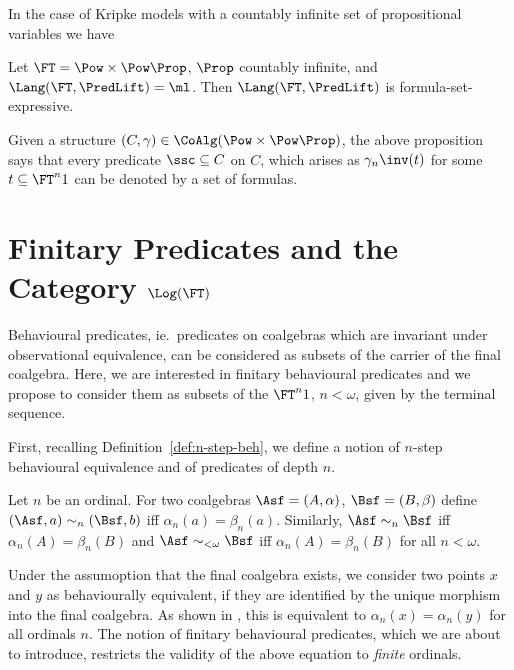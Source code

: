 \documentclass{entcs}
\begin{document}
In the case of Kripke models with a countably infinite set of propositional
variables we have

\begin{propn} \label{propn:surjection-weak}
  Let $\FT=\Pow\times\Pow\Prop$, $\Prop$ countably infinite, and
  $\Lang(\FT,\PredLift)=\ml$. 
  Then $\Lang(\FT,\PredLift)$ is formula-set-expressive.
\end{propn}
\noindent
Given a structure $(C, \gamma) \in \CoAlg(\Pow\times\Pow\Prop)$, the above
proposition says that every predicate $\ssc \subseteq C$ on $C$, which arises
as $\gamma_n\inv(t)$ for some $t \subseteq \FT^n 1$ can be denoted by
a set of formulas.








\section{Finitary Predicates and the Category $\Log(\FT)$}
\label{section:finitary-predicates}

Behavioural predicates, ie.\ predicates on coalgebras which are
invariant under observational equivalence, can be considered as
subsets of the carrier of the final coalgebra. Here, we are interested
in finitary behavioural predicates and we propose to consider them as
subsets of the $\FT^n 1$, $n<\omega$, given by the terminal sequence.


First, recalling Definition~\ref{def:n-step-beh}, we define a notion
of $n$-step behavioural equivalence and of predicates of depth $n$.

\begin{defn}
  Let $n$ be an ordinal. For two coalgebras $\Asf=(A,\alpha)$,
  $\Bsf=(B,\beta)$ define $(\Asf,a)\sim_n (\Bsf,b)$ iff
  $\alpha_n(a)=\beta_n(a)$. Similarly, $\Asf\sim_n\Bsf$ iff
  $\alpha_n(A)=\beta_n(B)$ and $\Asf\sim_{<\omega} \Bsf$ iff
  $\alpha_n(A)=\beta_n(B)$ for all $n<\omega$.
\end{defn}

Under the assumoption that the final coalgebra exists, we consider two
points $x$ and $y$ as behaviourally equivalent, if they are identified
by the unique morphism into the final coalgebra.  As shown in
\cite{adamek-koubek:gfp}, this is equivalent to $\alpha_n(x) =
\alpha_n(y)$ for all ordinals $n$. The notion of finitary behavioural
predicates, which we are about to introduce, restricts the validity of
the above equation to \emph{finite} ordinals.
\end{document}
